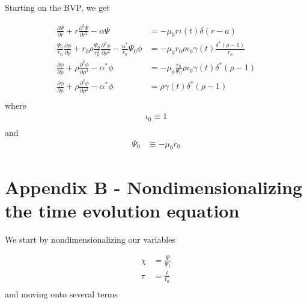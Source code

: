 \documentclass{article}
\begin{document}
Starting on the BVP, we get

\begin{equation} \label{wessonCurrentProfile}
\begin{split}
 \frac{\partial \Psi}{\partial r} +r   \frac{\partial^2 \Psi}{\partial r^2} - \alpha \Psi & = - \mu_0r  \iota(t) \delta (r-a)\\ 
 \frac{\Psi_0}{r_0} \frac{\partial \phi}{\partial \rho} + r_0 \rho \frac{\Psi_0}{r_0^2}   \frac{\partial^2 \phi}{\partial \rho^2} - \frac{\alpha^*}{r_0} \Psi_0 \phi & = - \mu_0 r_0 \rho \iota_0 \gamma(t) \frac{\delta^* (\rho - 1)}{r_0}\\
\frac{\partial \phi}{\partial \rho} + \rho   \frac{\partial^2 \phi}{\partial \rho^2} - \alpha^* \phi & = - \mu_0 \frac{r_0}{\Psi_0} \rho \iota_0 \gamma(t) \delta^* (\rho - 1)\\
\frac{\partial \phi}{\partial \rho} + \rho   \frac{\partial^2 \phi}{\partial \rho^2} - \alpha^* \phi & =  \rho \gamma(t) \delta^* (\rho - 1)\\
\end{split} 
\end{equation} 
where
\begin{equation} \label{wessonCurrentProfile}
\begin{split}
\iota_0 \equiv 1 \\
\end{split} 
\end{equation} 
and
\begin{equation} \label{wessonCurrentProfile}
\begin{split}
\Psi_0 & \equiv - \mu_0 r_0
\end{split} 
\end{equation} 


\section*{Appendix B - Nondimensionalizing the time evolution equation}

We start by nondimensionalizing our variables

\begin{equation} \label{wessonCurrentProfile}
\begin{split}
\chi & = \frac{\Psi}{\Psi_1}\\
\tau & = \frac{t}{t_0}\\
\end{split} 
\end{equation} 
and moving onto several terms
\end{document}
